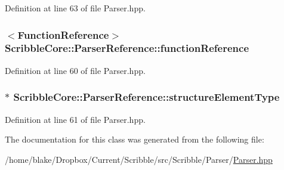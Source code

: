 Definition at line 63 of file Parser.\-hpp.

\hypertarget{class_scribble_core_1_1_parser_reference_ac1d91061b77ed79265e184e992b5dfe7}{
\subsubsection[{function\-Reference}]{$<${\bf Function\-Reference}$>$ Scribble\-Core\-::\-Parser\-Reference\-::function\-Reference}}\label{class_scribble_core_1_1_parser_reference_ac1d91061b77ed79265e184e992b5dfe7}


Definition at line 60 of file Parser.\-hpp.

\hypertarget{class_scribble_core_1_1_parser_reference_a637e85d515b38865bfaee3f3e0314d1b}{
\subsubsection[{structure\-Element\-Type}]{$\ast$ Scribble\-Core\-::\-Parser\-Reference\-::structure\-Element\-Type}}\label{class_scribble_core_1_1_parser_reference_a637e85d515b38865bfaee3f3e0314d1b}


Definition at line 61 of file Parser.\-hpp.



The documentation for this class was generated from the following file\-:\begin{DoxyCompactItemize}
\item 
/home/blake/\-Dropbox/\-Current/\-Scribble/src/\-Scribble/\-Parser/\hyperlink{_scribble_2_parser_2_parser_8hpp}{Parser.\-hpp}\end{DoxyCompactItemize}
